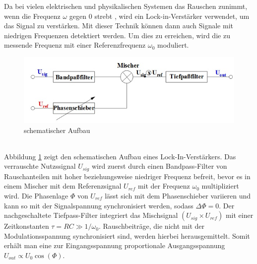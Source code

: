 Da bei vielen elektrischen und physikalischen Systemen das Rauschen zunimmt, wenn
die Frequenz $\omega$ gegen 0 strebt \cite{enet}, wird ein Lock-in-Verstärker
verwendet, um das Signal zu verstärken. Mit dieser Technik können dann auch
Signale mit niedrigen Frequenzen detektiert werden. Um dies zu erreichen, wird die
zu messende Frequenz mit einer Referenzfrequenz $\omega_0$ moduliert. \\
\begin{figure}[h]
  \includegraphics{Bilder/Schema.jpg}
  \caption{schematischer Aufbau}
  \label{fig:schema}
\end{figure} \\
Abbildung \ref{fig:schema} zeigt den schematischen Aufbau eines Lock-In-Verstärkers.
Das verrauschte Nutzssignal $U_{sig}$ wird zuerst durch einen Bandpass-Filter
von Rauschanteilen mit hoher beziehungsweise niedriger Frequenz befreit, bevor
es in einem Mischer mit dem Referenzsignal $U_{ref}$ mit der Frequenz $\omega_0$
multipliziert wird. Die Phasenlage $\Phi$ von $U_{ref}$ lässt sich mit dem
Phasenschieber variieren und kann so mit der Signalspannung synchronisiert werden,
sodass $\Delta\Phi =0$.
Der nachgeschaltete Tiefpass-Filter integriert das Mischsignal $(U_{sig}\times U_{ref})$
mit einer Zeitkonstanten $\tau = RC \gg 1/\omega_0$.
Rauschbeiträge, die nicht mit der Modulationsspannung synchronisiert sind, werden
hierbei herausgemittelt. Somit erhält man eine zur Eingangsspannung proportionale
Ausgangsspannung $U_{out} \propto U_0 \cos(\Phi)$.

